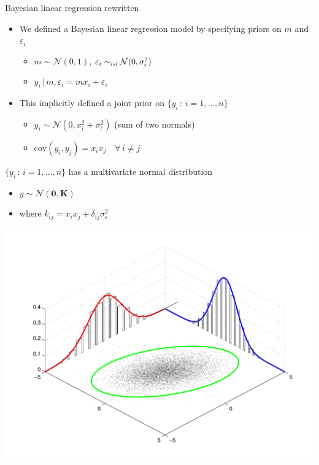 \begin{frame}{Bayesian linear regression rewritten}
  \begin{itemize}
    \item We defined a Bayesian linear regression model by specifying priors on $m$ and $\varepsilon_i$
    \begin{itemize}
      \item $m \sim \mathcal{N}(0, 1)$, $\varepsilon_i \sim_{\mbox{\tiny iid}} \mathcal{N}(0, \sigma_\varepsilon^2)$
      \item $y_i \,|\, m, \varepsilon_i = mx_i + \varepsilon_i$
    \end{itemize}
    \vspace{\baselineskip}
    \item This implicitly defined a joint prior on $\{y_i \,:\, i=1,\ldots,n\}$
    \begin{itemize}
      \item $y_i \sim \mathcal{N}(0, x_i^2 + \sigma_\varepsilon^2)$ (sum of two normals)
      \item $\textrm{cov}(y_i, y_j) = x_i x_j \quad \forall\,i\neq j$
    \end{itemize}
  \end{itemize}
      \fboxsep=0pt
	\noindent
		\begin{minipage}[t]{0.48\linewidth}
		  \vspace{-5.5\baselineskip}
			$\{y_i \,:\, i=1,\ldots,n\}$ has a multivariate normal distribution
    \begin{itemize}
      \item $y \sim \mathcal{N}(\mathbf{0}, \mathbf{K})$
      \item where $k_{ij} = x_i x_j + \delta_{ij} \sigma_\varepsilon^2$
    \end{itemize}
		\end{minipage}
		\hfill
		\begin{minipage}[t]{0.48\linewidth}
		\begin{center}
		  \includegraphics[width=0.9\linewidth]{../figures/multi_norm}
		\end{center}
		\end{minipage}
\end{frame}

